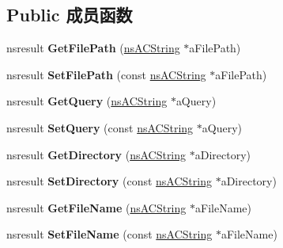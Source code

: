 \subsection*{Public 成员函数}
\begin{DoxyCompactItemize}
\item 
\mbox{\label{interfacens_i_u_r_l_a58a12aec43a350dc8863e3ec3bf4f498}} 
nsresult {\bfseries Get\+File\+Path} (\hyperlink{structns_c_string_container}{ns\+A\+C\+String} $\ast$a\+File\+Path)
\item 
\mbox{\label{interfacens_i_u_r_l_a8e84b4f90b665f5cb93dcba4f6d81820}} 
nsresult {\bfseries Set\+File\+Path} (const \hyperlink{structns_c_string_container}{ns\+A\+C\+String} $\ast$a\+File\+Path)
\item 
\mbox{\label{interfacens_i_u_r_l_a4ce333c5f23d08fa6ae98f83e57ac794}} 
nsresult {\bfseries Get\+Query} (\hyperlink{structns_c_string_container}{ns\+A\+C\+String} $\ast$a\+Query)
\item 
\mbox{\label{interfacens_i_u_r_l_ab95cfab45c5b57f4d422579133dc5b22}} 
nsresult {\bfseries Set\+Query} (const \hyperlink{structns_c_string_container}{ns\+A\+C\+String} $\ast$a\+Query)
\item 
\mbox{\label{interfacens_i_u_r_l_a3b8ff407ca8d4e31e5b8283d4f4bdf07}} 
nsresult {\bfseries Get\+Directory} (\hyperlink{structns_c_string_container}{ns\+A\+C\+String} $\ast$a\+Directory)
\item 
\mbox{\label{interfacens_i_u_r_l_a49af29398d68f1bde8005060b8dc886a}} 
nsresult {\bfseries Set\+Directory} (const \hyperlink{structns_c_string_container}{ns\+A\+C\+String} $\ast$a\+Directory)
\item 
\mbox{\label{interfacens_i_u_r_l_ab296db60d78a25085b2eb0a65a35ac6d}} 
nsresult {\bfseries Get\+File\+Name} (\hyperlink{structns_c_string_container}{ns\+A\+C\+String} $\ast$a\+File\+Name)
\item 
\mbox{\label{interfacens_i_u_r_l_a70f2801d70f096695dca4bf6e52d2a8f}} 
nsresult {\bfseries Set\+File\+Name} (const \hyperlink{structns_c_string_container}{ns\+A\+C\+String} $\ast$a\+File\+Name)

\end{DoxyCompactItemize}
